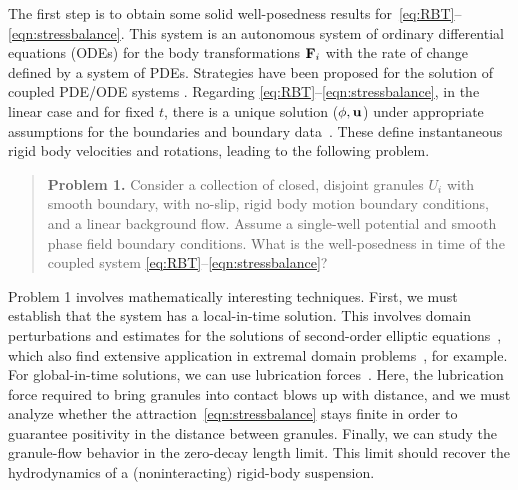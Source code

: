 The first step is to obtain some solid well-posedness results
for~\eqref{eq:RBT}--\eqref{eqn:stressbalance}. This system is an
autonomous system of ordinary differential equations (ODEs) for the body
transformations $\mathbf{F}_i$ with the rate of change defined by a system of
PDEs. Strategies have been proposed for the solution of coupled PDE/ODE
systems \cite{Carichino2018EnergybasedOS,Quarteroni2016GeometricMM}.
Regarding \eqref{eq:RBT}--\eqref{eqn:stressbalance}, in the linear case
and for fixed $t$, there is a unique solution ($\phi, \mathbf{u}$) under
appropriate assumptions for the boundaries and boundary
data~\cite{manasthesis, rac-gre2016, LAX}. These define instantaneous
rigid body velocities and rotations, leading to the following problem.
\begin{quotation}
  \noindent
  \textbf{Problem 1.} 
  Consider a collection of closed, disjoint granules $U_i$ with smooth
  boundary, with no-slip, rigid body motion boundary conditions, and a
  linear background flow. Assume a single-well potential and smooth
  phase field boundary conditions. What is the well-posedness in time of
  the coupled system \eqref{eq:RBT}--\eqref{eqn:stressbalance}?
\end{quotation}
Problem 1 involves mathematically interesting techniques. First, we must
establish that the system has a local-in-time solution. This involves
domain perturbations and estimates for the solutions of second-order
elliptic equations~\cite{Savar2002DomainPA, DANERS20081,
Lamboley2015EstimatesOF}, which also find extensive application in
extremal domain problems~\cite{Schiffer1954VariationOD,
Henrot2006ExtremumPF, bogosel:hal-03607776,Bogosel2022OnTP}, for
example.
For global-in-time solutions, we can use lubrication
forces~\cite{cawthorn_balmforth_2010, leal_2007}. Here, the lubrication
force required to bring granules into contact blows up with distance,
and we must analyze whether the attraction~\eqref{eqn:stressbalance}
stays finite in order to guarantee positivity in the distance between
granules.
Finally, we can study the granule-flow behavior in the
zero-decay length limit. This limit should recover the hydrodynamics of
a (noninteracting) rigid-body suspension.

